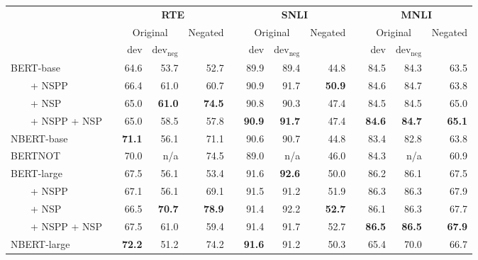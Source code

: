 \newcommand{\sig}{$^{\ast}$}
\setlength{\tabcolsep}{0.06in}
\footnotesize
\begin{tabular}{l r@{\hspace{0.15in}} rrr r@{\hspace{0.10in}} rrr r@{\hspace{0.10in}} rrr}
\toprule 
&& \multicolumn{3}{c}{\textbf{RTE}} && \multicolumn{3}{c}{\textbf{SNLI}} && \multicolumn{3}{c}{\textbf{MNLI}} \\ \cmidrule{3-5} \cmidrule{7-9} \cmidrule{11-13}
&& \multicolumn{2}{c}{Original} & \multirow[c]{2}{*}{Negated} && \multicolumn{2}{c}{Original} & \multirow[c]{2}{*}{Negated} && \multicolumn{2}{c}{Original} & \multirow[c]{2}{*}{Negated} \\ \cmidrule{3-4} \cmidrule{7-8} \cmidrule{11-12}
&& dev & $\text{dev}_{\text{neg}}$ && & dev & $\text{dev}_{\text{neg}}$ && & dev & $\text{dev}_{\text{neg}}$ \\
\midrule
{BERT-base} && 64.6 & 53.7 & 52.7 && 89.9 & 89.4 & 44.8 && 84.5 & 84.3 & 63.5\\ 
~~~~+ NSPP && 66.4 & 61.0 & 60.7 && 90.9 & 91.7 & \textbf{50.9} && 84.6 & 84.7 & 63.8\\ 
~~~~+ NSP && 65.0 & \textbf{61.0} & \textbf{74.5} && 90.8 & 90.3 & 47.4 && 84.5 & 84.5 & 65.0\\ 
~~~~+ NSPP + NSP && 65.0 & 58.5 & 57.8 && \textbf{90.9} & \textbf{91.7} & 47.4 && \textbf{84.6} & \textbf{84.7} & \textbf{65.1}\\ 
{NBERT-base} \cite{singh-etal-2023-nlms} && \textbf{71.1} & 56.1 & 71.1 && 90.6 & 90.7 & 44.8 && 83.4 & 82.8 & 63.8 \\
{BERTNOT} \cite{hosseini-etal-2021-understanding} && 70.0 & n/a & 74.5 && 89.0 & n/a & 46.0 && 84.3 & n/a & 60.9 \\
\midrule
{BERT-large} && 67.5 & 56.1 & 53.4 && 91.6 & \textbf{92.6} & 50.0 && 86.2 & 86.1 & 67.5\\ 
~~~~+ NSPP && 67.1 & 56.1 & 69.1 && 91.5 & 91.2 & 51.9 && 86.3 & 86.3 & 67.9\\ 
~~~~+ NSP && 66.5 & \textbf{70.7} & \textbf{78.9} && 91.4 & 92.2 & \textbf{52.7} && 86.1 & 86.3 & 67.7\\ 
~~~~+ NSPP + NSP && 67.5 & 61.0 & 59.4 && 91.4 & 91.7 & 52.7 && \textbf{86.5} & \textbf{86.5} & \textbf{67.9}\\ 
{NBERT-large} \cite{singh-etal-2023-nlms} && \textbf{72.2} & 51.2 & 74.2 && \textbf{91.6} & 91.2 & 50.3 && 65.4 & 70.0 & 66.7 \\


\end{tabular}
